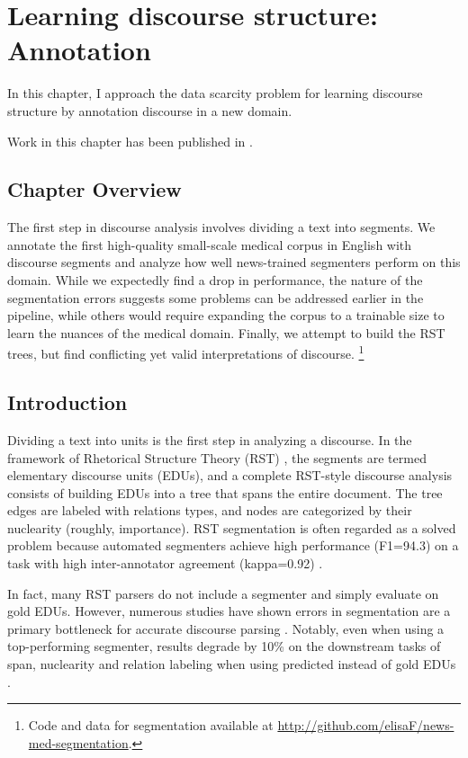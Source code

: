 \chapter{Learning discourse structure: Annotation}
\label{ch:annotation}
In this chapter, I approach the data scarcity problem for learning discourse structure by annotation discourse in a new domain.

Work in this chapter has been published in .

\section{Chapter Overview}

The first step in discourse analysis involves dividing a text into segments. We annotate the first high-quality small-scale medical corpus in English with discourse segments and analyze how well news-trained segmenters perform on this domain. While we expectedly find a drop in performance, the nature of the segmentation errors suggests some problems can be addressed earlier in the pipeline, while others would require expanding the corpus to a trainable size to learn the nuances of the medical domain. Finally, we attempt to build the RST trees, but find conflicting yet valid interpretations of discourse. \footnote{Code and data for segmentation available at \url{http://github.com/elisaF/news-med-segmentation}.}

\section{Introduction}

Dividing a text into units is the first step in analyzing a discourse. In the framework of Rhetorical Structure Theory (RST) \cite{Mann:1988}, the segments are termed elementary discourse units (EDUs), and a complete RST-style discourse analysis consists of building EDUs into a tree that spans the entire document. The tree edges are labeled with relations types, and nodes are categorized by their nuclearity (roughly, importance). RST segmentation is often regarded as a solved problem because automated segmenters achieve high performance (F1=94.3) on a task with high inter-annotator agreement (kappa=0.92) \cite{Wang:2018,Carlson:2001}.

In fact, many RST parsers do not include a segmenter and simply evaluate on gold EDUs. However, numerous studies have shown errors in segmentation are a primary bottleneck for accurate discourse parsing \cite{Soricut:2003,Fisher:2007,Joty:2015,Feng:2015}. Notably, even when using a top-performing segmenter, results degrade by 10\% on the downstream tasks of span, nuclearity and relation labeling when using predicted instead of gold EDUs \cite{Feng:2015}.

